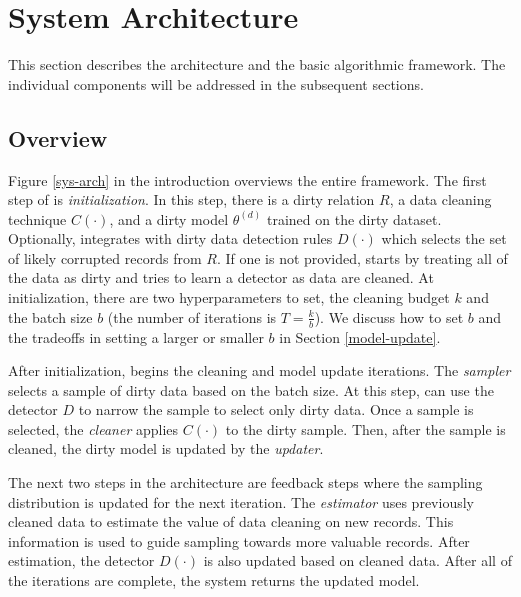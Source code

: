\section{System Architecture}\label{arch}
This section describes the \sys architecture and the basic algorithmic framework.
The individual components will be addressed in the subsequent sections.

\subsection{Overview}
Figure \ref{sys-arch} in the introduction overviews the entire framework.
The first step of \sys is \emph{initialization}.
In this step, there is a dirty relation $R$, a data cleaning technique $C(\cdot)$, and a dirty model $\theta^{(d)}$ trained on the dirty dataset. 
Optionally, \sys integrates with dirty data detection rules $D(\cdot)$ which selects the set of likely corrupted records from $R$.
If one is not provided, \sys starts by treating all of the data as dirty and tries to learn a detector as data are cleaned.
At initialization, there are two hyperparameters to set, the cleaning budget $k$ and the batch size $b$ (the number of iterations is $T = \frac{k}{b}$).
We discuss how to set $b$ and the tradeoffs in setting a larger or smaller $b$ in Section \ref{model-update}.

After initialization, \sys begins the cleaning and model update iterations.
The \emph{sampler} selects a sample of dirty data based on the batch size.
At this step, \sys can use the detector $D$ to narrow the sample to select only dirty data.
Once a sample is selected, the \emph{cleaner} applies $C(\cdot)$ to the dirty sample.
Then, after the sample is cleaned, the dirty model is updated by the \emph{updater}.

The next two steps in the architecture are feedback steps where the sampling distribution is updated for the next iteration.
The \emph{estimator} uses previously cleaned data to estimate the value of data cleaning on new records.
This information is used to guide sampling towards more valuable records.
After estimation, the detector $D(\cdot)$ is also updated based on cleaned data.
After all of the iterations are complete, the system returns the updated model.

